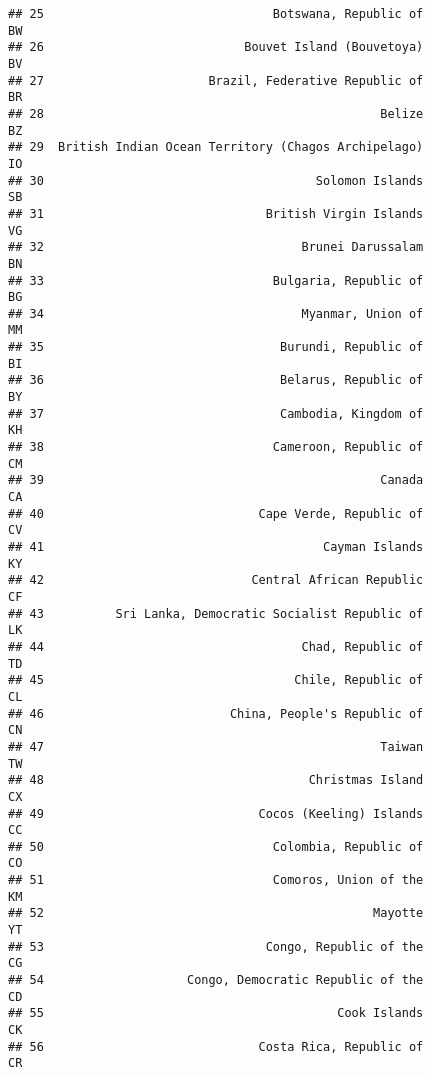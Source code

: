 \documentclass[
]{article}
\begin{document}
\begin{verbatim}
## 25                                Botswana, Republic of                      BW
## 26                            Bouvet Island (Bouvetoya)                      BV
## 27                       Brazil, Federative Republic of                      BR
## 28                                               Belize                      BZ
## 29  British Indian Ocean Territory (Chagos Archipelago)                      IO
## 30                                      Solomon Islands                      SB
## 31                               British Virgin Islands                      VG
## 32                                    Brunei Darussalam                      BN
## 33                                Bulgaria, Republic of                      BG
## 34                                    Myanmar, Union of                      MM
## 35                                 Burundi, Republic of                      BI
## 36                                 Belarus, Republic of                      BY
## 37                                 Cambodia, Kingdom of                      KH
## 38                                Cameroon, Republic of                      CM
## 39                                               Canada                      CA
## 40                              Cape Verde, Republic of                      CV
## 41                                       Cayman Islands                      KY
## 42                             Central African Republic                      CF
## 43          Sri Lanka, Democratic Socialist Republic of                      LK
## 44                                    Chad, Republic of                      TD
## 45                                   Chile, Republic of                      CL
## 46                          China, People's Republic of                      CN
## 47                                               Taiwan                      TW
## 48                                     Christmas Island                      CX
## 49                              Cocos (Keeling) Islands                      CC
## 50                                Colombia, Republic of                      CO
## 51                                Comoros, Union of the                      KM
## 52                                              Mayotte                      YT
## 53                               Congo, Republic of the                      CG
## 54                    Congo, Democratic Republic of the                      CD
## 55                                         Cook Islands                      CK
## 56                              Costa Rica, Republic of                      CR

\end{verbatim}
\end{document}
